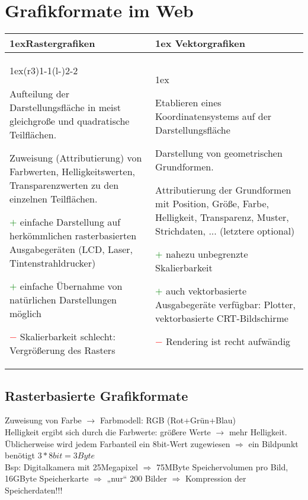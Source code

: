 \chapter{Grafikformate im Web}
\begin{table}[ht]
\begin{tabularx}{\linewidth}{>{\parskip1ex}X@{\kern4\tabcolsep}>{\parskip1ex}X}

\hfil\bfseries Rastergrafiken
&
\hfil\bfseries Vektorgrafiken
\\\cmidrule(r{3\tabcolsep}){1-1}\cmidrule(l{-\tabcolsep}){2-2}

Aufteilung der Darstellungsfläche in meist gleichgroße und quadratische Teilflächen.\par
Zuweisung (Attributierung) von Farbwerten, Helligkeitswerten, Transparenzwerten zu den einzelnen Teilflächen.\par
\textcolor{green}{\large \textbf{$+$}} einfache Darstellung auf herkömmlichen rasterbasierten Ausgabegeräten (LCD, Laser, Tintenstrahldrucker)\par
\textcolor{green}{\large \textbf{$+$}} einfache Übernahme von natürlichen Darstellungen möglich\par
\textcolor{red}{\large{\textbf{$-$}}} Skalierbarkeit schlecht: Vergrößerung des Rasters

&

Etablieren eines Koordinatensystems auf der Darstellungsfläche\par
Darstellung von geometrischen Grundformen.\par
Attributierung der Grundformen mit Position, Größe, Farbe, Helligkeit, Transparenz, Muster, Strichdaten, ... (letztere optional)\par
\textcolor{green}{\large \textbf{$+$}} nahezu unbegrenzte Skalierbarkeit\par
\textcolor{green}{\large{\textbf{$+$}}} auch vektorbasierte Ausgabegeräte verfügbar: Plotter, vektorbasierte CRT-Bildschirme\par
\textcolor{red}{\large{\textbf{$-$}}} Rendering ist recht aufwändig

\end{tabularx}
\end{table}

\section{Rasterbasierte Grafikformate}
Zuweisung von Farbe $\rightarrow$ Farbmodell: RGB (Rot+Grün+Blau)\\
Helligkeit ergibt sich durch die Farbwerte: größere Werte $\rightarrow$ mehr Helligkeit.\\
Üblicherweise wird jedem Farbanteil ein 8bit-Wert zugewiesen $\Rightarrow$ ein Bildpunkt benötigt $3*8bit=3Byte$\\
Bsp: Digitalkamera mit 25Megapixel $\Rightarrow$ 75MByte Speichervolumen pro Bild, 16GByte Speicherkarte $\Rightarrow$ „nur“ 200 Bilder $\Rightarrow$ Kompression der Speicherdaten!!!\\

